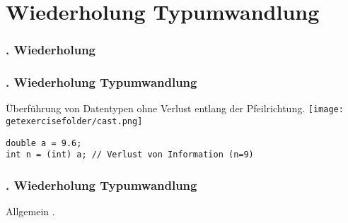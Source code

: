 \def\stitle{Wiederholung Typumwandlung}
\section{\stitle}\label{K:wdh}
\begin{frame}
  \frametitle{\kap. Wiederholung}%
\tableofcontents[current]
\end{frame}

\begin{frame}[fragile]%
  \frametitle{\kap. \stitle}%

Überführung von Datentypen ohne Verlust entlang der Pfeilrichtung.
\texttt{[image: \\getexercisefolder/cast.png]}

\begin{lstlisting}[style=java, frame=single]
double a = 9.6;
int n = (int) a; // Verlust von Information (n=9)
\end{lstlisting}
\end{frame}



\begin{frame}[fragile]%
  \frametitle{\kap. \stitle}%

Allgemein .

\end{frame}
